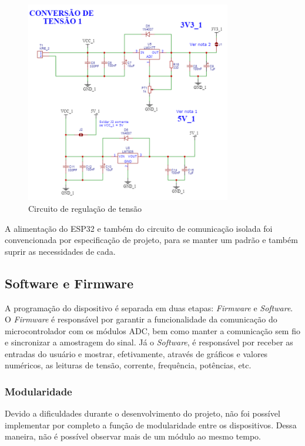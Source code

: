 \begin{figure}[htb!]
    \caption{Circuito de regulação de tensão}
    \label{fig:circ-conv-T}
    \includegraphics[width=0.8\textwidth]{figuras/circ-conv-T.png}
    \fonte{}
\end{figure}

A alimentação do ESP32 e também do circuito de comunicação isolada foi convencionada por especificação de projeto, para se manter um padrão e também suprir as necessidades de cada.

\subsection{Software e Firmware}\label{softfirm}

A programação do dispositivo é separada em duas etapas: \textit{Firmware} e \textit{Software}. O \textit{Firmware} é responsável por garantir a funcionalidade da comunicação do microcontrolador com os módulos \gls{ADC}, bem como manter a comunicação sem fio e sincronizar a amostragem do sinal.
Já o \textit{Software}, é responsável por receber as entradas do usuário e mostrar, efetivamente, através de gráficos e valores numéricos, as leituras de tensão, corrente, frequência, potências, etc.

\subsubsection{Modularidade}\label{modular-softw}

Devido a dificuldades durante o desenvolvimento do projeto, não foi possível implementar por completo a função de modularidade entre os dispositivos. Dessa maneira, não é possível observar mais de um módulo ao mesmo tempo.


